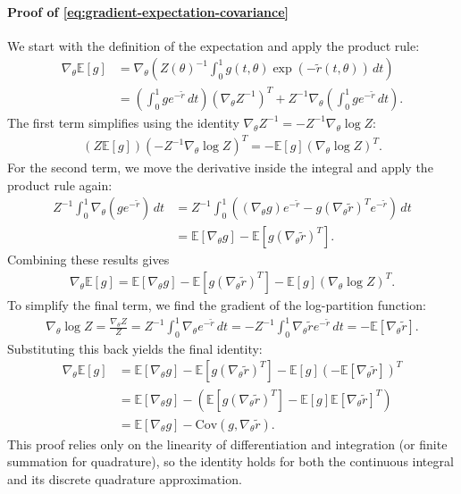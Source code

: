 \documentclass{article}
\begin{document}
\paragraph{Proof of \cref{eq:gradient-expectation-covariance}}

We start with the definition of the expectation and apply the product rule:
%
\begin{align}
  \nabla_\theta \mathbb{E}[g] & = \nabla_\theta \left( Z(\theta)^{-1} \int_0^1 g(t,\theta) \exp(-\tilde{r}(t,\theta)) \, dt \right)                                            \\
                              & = \left(\int_0^1 g e^{-\tilde{r}} \, dt\right) (\nabla_\theta Z^{-1})^T + Z^{-1} \nabla_\theta \left( \int_0^1 g e^{-\tilde{r}} \, dt \right).
\end{align}
%
The first term simplifies using the identity $\nabla_\theta Z^{-1} = -Z^{-1} \nabla_\theta \log Z$:
%
\begin{align}
  \left(Z \mathbb{E}[g]\right) \left(-Z^{-1} \nabla_\theta \log Z\right)^T = -\mathbb{E}[g] (\nabla_\theta \log Z)^T.
\end{align}
%
For the second term, we move the derivative inside the integral and apply the product rule again:
%
\begin{align}
  Z^{-1} \int_0^1 \nabla_\theta(g e^{-\tilde{r}}) \, dt & = Z^{-1} \int_0^1 \left( (\nabla_\theta g) e^{-\tilde{r}} - g (\nabla_\theta \tilde{r})^T e^{-\tilde{r}} \right) \, dt \\
                                                        & = \mathbb{E}[\nabla_\theta g] - \mathbb{E}[g (\nabla_\theta \tilde{r})^T].
\end{align}
%
Combining these results gives
%
\begin{align}
  \nabla_\theta \mathbb{E}[g] = \mathbb{E}[\nabla_\theta g] - \mathbb{E}[g (\nabla_\theta \tilde{r})^T] - \mathbb{E}[g](\nabla_\theta \log Z)^T.
\end{align}
%
To simplify the final term, we find the gradient of the log-partition function:
%
\begin{align}
  \nabla_\theta \log Z = \frac{\nabla_\theta Z}{Z} = Z^{-1} \int_0^1 \nabla_\theta e^{-\tilde{r}} \, dt = -Z^{-1} \int_0^1 \nabla_\theta \tilde{r} e^{-\tilde{r}} \, dt = -\mathbb{E}[\nabla_\theta \tilde{r}].
\end{align}
%
Substituting this back yields the final identity:
%
\begin{align}
  \nabla_\theta \mathbb{E}[g] & = \mathbb{E}[\nabla_\theta g] - \mathbb{E}[g (\nabla_\theta \tilde{r})^T] - \mathbb{E}[g] (-\mathbb{E}[\nabla_\theta \tilde{r}])^T \\
                              & = \mathbb{E}[\nabla_\theta g] - (\mathbb{E}[g (\nabla_\theta \tilde{r})^T] - \mathbb{E}[g] \mathbb{E}[\nabla_\theta \tilde{r}]^T)  \\
                              & = \mathbb{E}[\nabla_\theta g] - \mathrm{Cov}(g, \nabla_\theta \tilde{r}).
\end{align}
%
This proof relies only on the linearity of differentiation and integration (or finite summation for quadrature), so the identity holds for both the continuous integral and its discrete quadrature approximation.
\end{document}
